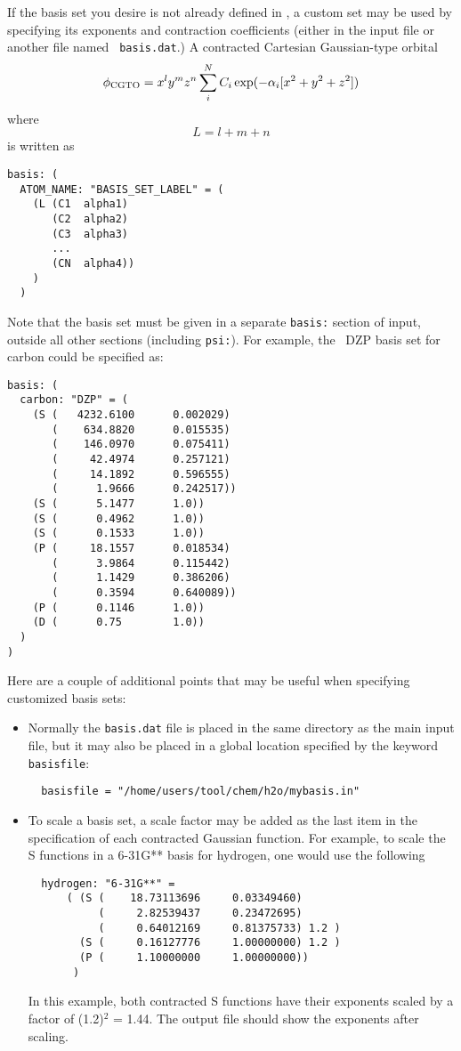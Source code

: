 If the basis set you desire is not already defined in \PSIthree, a
custom set may be used by specifying its exponents and contraction
coefficients (either in the input file or another file named {\tt
basis.dat}.) A contracted Cartesian Gaussian-type orbital
\begin{equation}
\phi_{\rm CGTO} =  x^ly^mz^n\sum_i^N C_i \exp(-\alpha_i[x^2+y^2+z^2])
\end{equation}
where
\begin{equation}
L = l+m+n
\end{equation}
is written as
\begin{verbatim}
basis: (
  ATOM_NAME: "BASIS_SET_LABEL" = (
    (L (C1  alpha1)
       (C2  alpha2)
       (C3  alpha3)
       ...
       (CN  alpha4))   
    )
  )
\end{verbatim}
Note that the basis set must be given in a separate {\tt basis:}
section of input, outside all other sections (including {\tt psi:}).
For example, the \PSIthree\ DZP basis set for carbon could be
specified as:
\begin{verbatim}
basis: (
  carbon: "DZP" = (
    (S (   4232.6100      0.002029) 
       (    634.8820      0.015535)
       (    146.0970      0.075411)
       (     42.4974      0.257121)
       (     14.1892      0.596555) 
       (      1.9666      0.242517))
    (S (      5.1477      1.0))
    (S (      0.4962      1.0))
    (S (      0.1533      1.0))
    (P (     18.1557      0.018534)
       (      3.9864      0.115442)
       (      1.1429      0.386206)
       (      0.3594      0.640089))
    (P (      0.1146      1.0))
    (D (      0.75        1.0))
  )
)
\end{verbatim}

Here are a couple of additional points that may be useful when
specifying customized basis sets:
\begin{itemize}
\item Normally the {\tt basis.dat} file is placed in the same
directory as the main input file, but it may also be placed in a
global location specified by the keyword {\tt basisfile}:
\begin{verbatim}
  basisfile = "/home/users/tool/chem/h2o/mybasis.in"
\end{verbatim}
\item To scale a basis set, a scale factor may be added as the last item
in the specification of each contracted Gaussian function.  For
example, to scale the S functions in a 6-31G** basis for hydrogen,
one would use the following
\begin{verbatim}
  hydrogen: "6-31G**" =
      ( (S (    18.73113696     0.03349460)
           (     2.82539437     0.23472695)
           (     0.64012169     0.81375733) 1.2 )
        (S (     0.16127776     1.00000000) 1.2 )
        (P (     1.10000000     1.00000000))
       )
\end{verbatim}
In this example, both contracted S functions have their exponents
scaled by a factor of (1.2)$^2$ = 1.44.  The output file should show
the exponents after scaling.
\end{itemize}
